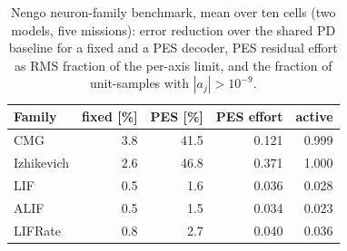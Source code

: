 \begin{table}[t]
\caption{Nengo neuron-family benchmark, mean over ten cells (two models, five missions): error reduction over the shared PD baseline for a fixed and a PES decoder, PES residual effort as RMS fraction of the per-axis limit, and the fraction of unit-samples with $|a_j|>10^{-9}$.}
\label{tab:family}\centering\footnotesize
\setlength{\tabcolsep}{4pt}
\begin{tabular}{@{}lrrrr@{}}
\toprule
Family&fixed [\%]&PES [\%]&PES effort&active\\\midrule
CMG&3.8&41.5&0.121&0.999\\
Izhikevich&2.6&46.8&0.371&1.000\\
LIF&0.5&1.6&0.036&0.028\\
ALIF&0.5&1.5&0.034&0.023\\
LIFRate&0.8&2.7&0.040&0.036\\
\bottomrule
\end{tabular}
\end{table}
